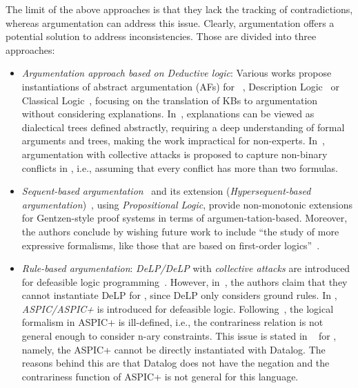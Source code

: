 The limit of the above approaches is that they lack the tracking of contradictions, whereas argumentation can address this issue.
Clearly, argumentation offers a potential solution to address inconsistencies. Those are divided into three approaches:
\begin{itemize}
       \item \emph{Argumentation approach based on Deductive logic}: Various works propose instantiations of abstract argumentation (AFs) for  \datalogPM~\cite{ARIOUA201776,Yun2020SetsOA}, Description Logic~\cite{ZhangL13} or Classical Logic~\cite{DAgostinoM18}, focusing on the translation of KBs to argumentation without considering explanations.
       In~\cite{LoanHo2022}, explanations can be viewed as dialectical trees defined abstractly, requiring a deep understanding of formal arguments and trees, making the work impractical for non-experts.
       In~\cite{Yun2020SetsOA,yun2018}, argumentation with collective attacks is proposed to capture non-binary conflicts in \datalogPM, i.e., assuming that every conflict has more than two formulas.

        \item \emph{Sequent-based argumentation}~\cite{ArieliS19} and its extension (\emph{Hypersequent-based argumentation})~\cite{BorgAS17}, using \textit{Propositional Logic}, provide non-monotonic extensions for Gentzen-style proof systems in terms of argumen-tation-based.
        Moreover, the authors conclude by wishing future work to include “the study of more expressive formalisms, like those that are based on first-order logics”~\cite{ArieliS19}.
       
       \item \emph{Rule-based argumentation}: 
       \emph{DeLP/DeLP} with \emph{collective attacks} are introduced for defeasible logic programming~\cite{Alejandro2014,AlsinetBG10}. However, in~\cite{Yun2020SetsOA}, the authors claim that they cannot instantiate DeLP for \datalogPM, since DeLP only considers ground rules.
       In \cite{Prakken2002,ModgilP14}, \emph{ASPIC/ASPIC+} is introduced for defeasible logic. Following~\cite{Amgoud12}, the logical formalism in ASPIC+ is ill-defined, i.e., the contrariness relation is not general enough to consider n-ary constraints. This issue is stated in ~\cite{Yun2020SetsOA} for \datalogPM, namely, the ASPIC+ cannot be directly instantiated with Datalog. The reasons behind this are that Datalog does not have the negation and the contrariness function of ASPIC+ is not general for this language.


\end{itemize}
